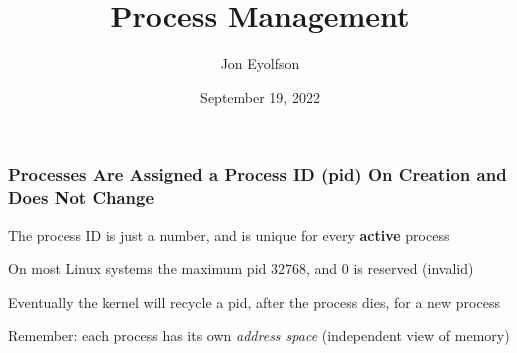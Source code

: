 

\title{Process Management}
\author{Jon Eyolfson}
\date{September 19, 2022}


  \begin{frame}
    \titlepage
  \end{frame}

  \begin{frame}
    \frametitle{Processes Are Assigned a Process ID (pid) On Creation and Does Not Change}

    The process ID is just a number, and is unique for every \textbf{active}
    process

    \vspace{2em}

    On most Linux systems the maximum pid 32768, and 0 is reserved (invalid)

    \vspace{2em}

    Eventually the kernel will recycle a pid, after the process dies, for a new process

    \vspace{4em}

    Remember: each process has its own \textit{address space} (independent view of memory)
  \end{frame}

